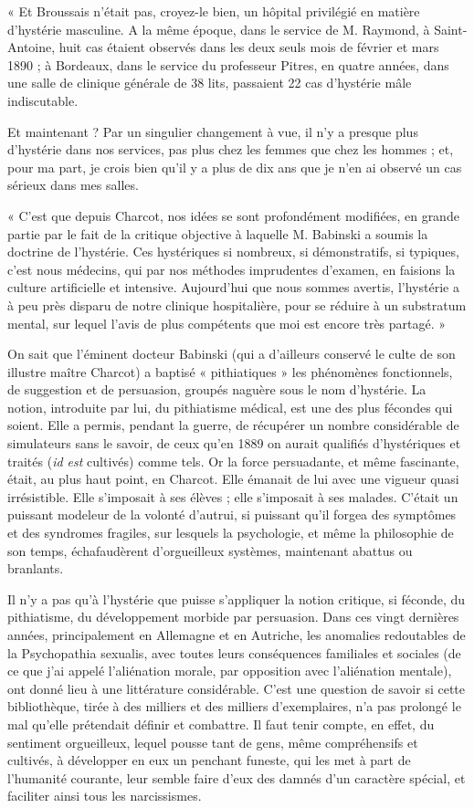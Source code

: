 \documentclass[french,twoside]{book} %
\begin{document}
« Et Broussais n’était pas, croyez-le bien, un hôpital privilégié en matière d’hystérie masculine. A la même époque, dans le service de M. Raymond, à Saint-Antoine, huit cas étaient observés dans les deux seuls mois de février et mars 1890 ; à Bordeaux, dans le service du professeur Pitres, en quatre années, dans une salle de clinique générale de 38 lits, passaient 22 cas d’hystérie mâle indiscutable.\par
Et maintenant ? Par un singulier changement à vue, il n’y a presque plus d’hystérie dans nos services, pas plus chez les femmes que chez les hommes ; et, pour ma part, je crois bien qu’il y a plus de dix ans que je n’en ai observé un cas sérieux dans mes salles.\par
« C’est que depuis Charcot, nos idées se sont profondément modifiées, en grande partie par le fait de la critique objective à laquelle M. Babinski a soumis la doctrine de l’hystérie. Ces hystériques si nombreux, si démonstratifs, si typiques, c’est nous médecins, qui par nos méthodes imprudentes d’examen, en faisions la culture artificielle et intensive. Aujourd’hui que nous sommes avertis, l’hystérie a à peu près disparu de notre clinique hospitalière, pour se réduire à un substratum mental, sur lequel l’avis de plus compétents que moi est encore très partagé. »\par
On sait que l’éminent docteur Babinski (qui a d’ailleurs conservé le culte de son illustre maître Charcot) a baptisé « pithiatiques » les phénomènes fonctionnels, de suggestion et de persuasion, groupés naguère sous le nom d’hystérie. La notion, introduite par lui, du pithiatisme médical, est une des plus fécondes qui soient. Elle a permis, pendant la guerre, de récupérer un nombre considérable de simulateurs sans le savoir, de ceux qu’en 1889 on aurait qualifiés d’hystériques et traités ({\itshape id est} cultivés) comme tels. Or la force persuadante, et même fascinante, était, au plus haut point, en Charcot. Elle émanait de lui avec une vigueur quasi irrésistible. Elle s’imposait à ses élèves ; elle s’imposait à ses malades. C’était un puissant modeleur de la volonté d’autrui, si puissant qu’il forgea des symptômes et des syndromes fragiles, sur lesquels la psychologie, et même la philosophie de son temps, échafaudèrent d’orgueilleux systèmes, maintenant abattus ou branlants.\par
Il n’y a pas qu’à l’hystérie que puisse s’appliquer la notion critique, si féconde, du pithiatisme, du développement morbide par persuasion. Dans ces vingt dernières années, principalement en Allemagne et en Autriche, les anomalies redoutables de la Psychopathia sexualis, avec toutes leurs conséquences familiales et sociales (de ce que j’ai appelé l’aliénation morale, par opposition avec l’aliénation mentale), ont donné lieu à une littérature considérable. C’est une question de savoir si cette bibliothèque, tirée à des milliers et des milliers d’exemplaires, n’a pas prolongé le mal qu’elle prétendait définir et combattre. Il faut tenir compte, en effet, du sentiment orgueilleux, lequel pousse tant de gens, même compréhensifs et cultivés, à développer en eux un penchant funeste, qui les met à part de l’humanité courante, leur semble faire d’eux des damnés d’un caractère spécial, et faciliter ainsi tous les narcissismes.\par
\end{document}

